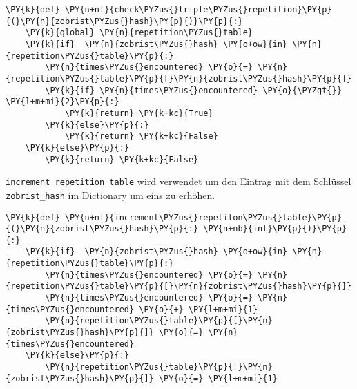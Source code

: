     \begin{tcolorbox}[fontupper=\linespread{.66}\selectfont, breakable, size=fbox, boxrule=1pt, pad at break*=1mm,colback=cellbackground, colframe=cellborder]
\begin{Verbatim}[commandchars=\\\{\}]
\PY{k}{def} \PY{n+nf}{check\PYZus{}triple\PYZus{}repetition}\PY{p}{(}\PY{n}{zobrist\PYZus{}hash}\PY{p}{)}\PY{p}{:}
    \PY{k}{global} \PY{n}{repetition\PYZus{}table}
    \PY{k}{if}  \PY{n}{zobrist\PYZus{}hash} \PY{o+ow}{in} \PY{n}{repetition\PYZus{}table}\PY{p}{:}
        \PY{n}{times\PYZus{}encountered} \PY{o}{=} \PY{n}{repetition\PYZus{}table}\PY{p}{[}\PY{n}{zobrist\PYZus{}hash}\PY{p}{]}
        \PY{k}{if} \PY{n}{times\PYZus{}encountered} \PY{o}{\PYZgt{}} \PY{l+m+mi}{2}\PY{p}{:}
            \PY{k}{return} \PY{k+kc}{True}
        \PY{k}{else}\PY{p}{:}
            \PY{k}{return} \PY{k+kc}{False}
    \PY{k}{else}\PY{p}{:}
        \PY{k}{return} \PY{k+kc}{False}
\end{Verbatim}
\end{tcolorbox}

    \texttt{increment\_repetition\_table} wird verwendet um den Eintrag mit
dem Schlüssel \texttt{zobrist\_hash} im Dictionary um eins zu erhöhen.

\bigskip

    \begin{tcolorbox}[fontupper=\linespread{.66}\selectfont, breakable, size=fbox, boxrule=1pt, pad at break*=1mm,colback=cellbackground, colframe=cellborder]
\begin{Verbatim}[commandchars=\\\{\}]
\PY{k}{def} \PY{n+nf}{increment\PYZus{}repetiton\PYZus{}table}\PY{p}{(}\PY{n}{zobrist\PYZus{}hash}\PY{p}{:} \PY{n+nb}{int}\PY{p}{)}\PY{p}{:}
    \PY{k}{if}  \PY{n}{zobrist\PYZus{}hash} \PY{o+ow}{in} \PY{n}{repetition\PYZus{}table}\PY{p}{:}
        \PY{n}{times\PYZus{}encountered} \PY{o}{=} \PY{n}{repetition\PYZus{}table}\PY{p}{[}\PY{n}{zobrist\PYZus{}hash}\PY{p}{]}
        \PY{n}{times\PYZus{}encountered} \PY{o}{=} \PY{n}{times\PYZus{}encountered} \PY{o}{+} \PY{l+m+mi}{1}
        \PY{n}{repetition\PYZus{}table}\PY{p}{[}\PY{n}{zobrist\PYZus{}hash}\PY{p}{]} \PY{o}{=} \PY{n}{times\PYZus{}encountered}
    \PY{k}{else}\PY{p}{:}
        \PY{n}{repetition\PYZus{}table}\PY{p}{[}\PY{n}{zobrist\PYZus{}hash}\PY{p}{]} \PY{o}{=} \PY{l+m+mi}{1}
\end{Verbatim}
\end{tcolorbox}

